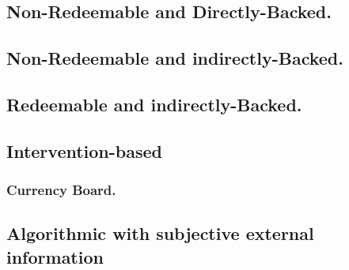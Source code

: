 \subsection{Non-Redeemable and Directly-Backed.}
% 

\subsection{Non-Redeemable and indirectly-Backed.}


\subsection{Redeemable and indirectly-Backed.}



\subsection{Intervention-based} %

 
\subsubsection{Currency Board.}

\subsection{Algorithmic with subjective external information}

